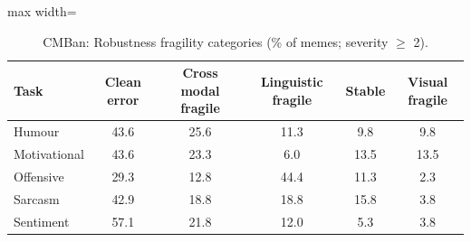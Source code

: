 \begin{table}[t]
\centering
\small
\caption{CMBan: Robustness fragility categories (\% of memes; severity $\geq$ 2).}
\label{tab:fragility_table_cmban}
\begin{adjustbox}{max width=\columnwidth}
\begin{tabular}{lccccc}
\toprule
Task & Clean error & Cross modal fragile & Linguistic fragile & Stable & Visual fragile \\
\midrule
Humour & 43.6 & 25.6 & 11.3 & 9.8 & 9.8 \\
Motivational & 43.6 & 23.3 & 6.0 & 13.5 & 13.5 \\
Offensive & 29.3 & 12.8 & 44.4 & 11.3 & 2.3 \\
Sarcasm & 42.9 & 18.8 & 18.8 & 15.8 & 3.8 \\
Sentiment & 57.1 & 21.8 & 12.0 & 5.3 & 3.8 \\
\bottomrule
\end{tabular}
\end{adjustbox}
\end{table}
